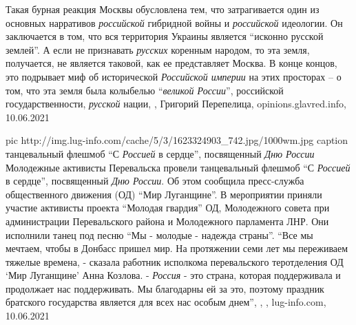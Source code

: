 Такая бурная реакция Москвы обусловлена тем, что затрагивается один из основных
нарративов \emph{российской} гибридной войны и \emph{российской} идеологии. Он заключается в
том, что вся территория Украины является \enquote{исконно русской землей}. А если не
признавать \emph{русских} коренным народом, то эта земля, получается, не является
таковой, как ее представляет Москва. В конце концов, это подрывает миф об
исторической \emph{Российской империи} на этих просторах – о том, что эта земля была
колыбелью \enquote{\emph{великой России}}, российской государственности, \emph{русской} нации,
, 
Григорий Перепелица, opinions.glavred.info, 10.06.2021

\ifcmt
  pic http://img.lug-info.com/cache/5/3/1623324903_742.jpg/1000wm.jpg
  caption танцевальный флешмоб \enquote{С \emph{Россией} в сердце}, посвященный \emph{Дню России}
\fi
Молодежные активисты Перевальска провели танцевальный флешмоб \enquote{С
\emph{Россией} в сердце}, посвященный \emph{Дню России}. Об этом сообщила
пресс-служба общественного движения (ОД) \enquote{Мир Луганщине}.  В
мероприятии приняли участие активисты проекта \enquote{Молодая гвардия} ОД,
Молодежного совета при администрации Перевальского района и Молодежного
парламента ЛНР. Они исполнили танец под песню \enquote{Мы - молодые - надежда
страны}.  \enquote{Все мы мечтаем, чтобы в Донбасс пришел мир. На протяжении
семи лет мы переживаем тяжелые времена, - сказала работник исполкома
перевальского теротделения ОД \enquote{Мир Луганщине} Анна Козлова. -
\emph{Россия} - это страна, которая поддерживала и продолжает нас поддерживать.
Мы благодарны ей за это, поэтому праздник братского государства является для
всех нас особым днем},
, 
, lug-info.com, 10.06.2021

